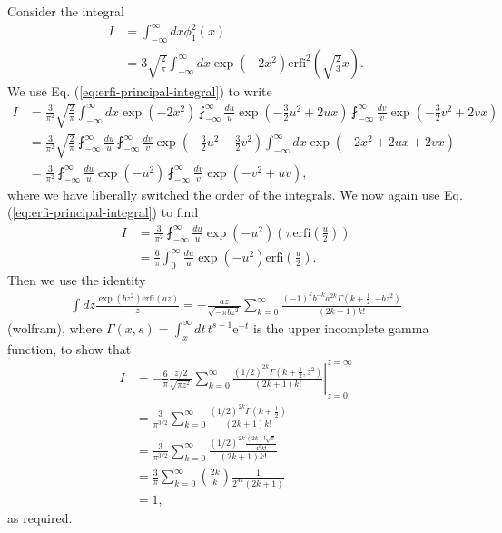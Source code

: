 \documentclass[11pt,letterpaper]{article}
\newcommand{\eq}[1]{\begin{align}#1\end{align}}
\newcommand{\erfi}{\text{erfi}}
\begin{document}
Consider the integral
\eq{
	I&=\int_{-\infty}^\infty dx \phi_1^2\left(x\right) \\
	&=3\sqrt{\frac{2}{\pi}}\int_{-\infty}^\infty dx\exp\left(-2x^2\right)\erfi^2\left(\sqrt{\frac{2}{3}}x\right).
}
We use Eq. (\ref{eq:erfi-principal-integral}) to write
\eq{
	I&=\frac{3}{\pi^2}\sqrt{\frac{2}{\pi}}\int_{-\infty}^\infty dx\exp\left(-2x^2\right)\fint_{-\infty}^\infty \frac{du}{u} \exp\left(-\frac{3}{2}u^2+2ux\right)\fint_{-\infty}^\infty \frac{dv}{v} \exp\left(-\frac{3}{2}v^2+2vx\right)\\
	&=\frac{3}{\pi^2}\sqrt{\frac{2}{\pi}}\fint_{-\infty}^\infty \frac{du}{u}\fint_{-\infty}^\infty \frac{dv}{v}
	\exp\left(-\frac{3}{2}u^2-\frac{3}{2}v^2\right) \int_{-\infty}^\infty dx \exp\left(-2x^2+2ux+2vx\right)\\
	&=\frac{3}{\pi^2}\fint_{-\infty}^\infty \frac{du}{u}\exp\left(-u^2\right)\fint_{-\infty}^\infty \frac{dv}{v}
	\exp\left(-v^2+uv\right),
}
where we have liberally switched the order of the integrals. We now again use Eq. (\ref{eq:erfi-principal-integral}) to find
\eq{
	I&=\frac{3}{\pi^2}\fint_{-\infty}^\infty \frac{du}{u}\exp\left(-u^2\right)\left(\pi\erfi\left(\frac{u}{2}\right)\right)\\
	&=\frac{6}{\pi}\int_{0}^\infty \frac{du}{u}\exp\left(-u^2\right)\erfi\left(\frac{u}{2}\right).
}
Then we use the identity
\eq{
	\int dz\frac{\exp\left(bz^2\right)\erfi\left(az\right)}{z}=-\frac{az}{\sqrt{-\pi bz^2}}\sum_{k=0}^{\infty}\frac{\left(-1\right)^kb^{-k}a^{2k}\Gamma\left(k+\frac{1}{2},-bz^2\right)}{\left(2k+1\right)k!}
}
(wolfram), where $\Gamma\left(x,s\right)=\int_{x}^{\infty}dt \,t^{s-1}\text{e}^{-t}$ is the upper incomplete gamma function, to show that
\eq{
	I&=\left.-\frac{6}{\pi}\frac{z/2}{\sqrt{\pi z^2}}\sum_{k=0}^{\infty}\frac{\left(1/2\right)^{2k}\Gamma\left(k+\frac{1}{2},z^2\right)}{\left(2k+1\right)k!}\right|_{z=0}^{z=\infty}\\
	&=\frac{3}{\pi^{3/2}}\sum_{k=0}^{\infty}\frac{\left(1/2\right)^{2k}\Gamma\left(k+\frac{1}{2}\right)}{\left(2k+1\right)k!}\\
	&=\frac{3}{\pi^{3/2}}\sum_{k=0}^{\infty}\frac{\left(1/2\right)^{2k}\frac{\left(2k\right)!\sqrt{\pi}}{4^kk!}}{\left(2k+1\right)k!}\\
	&=\frac{3}{\pi}\sum_{k=0}^{\infty}\binom{2k}{k}\frac{1}{2^{4k}\left(2k+1\right)}\\
	&=1,
}
as required.
\end{document}

